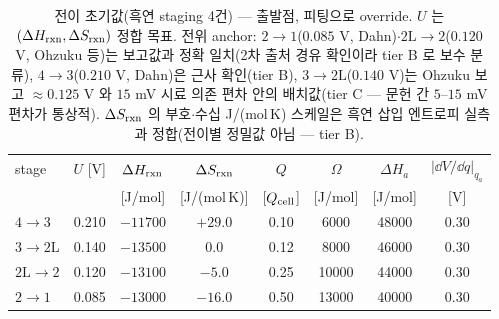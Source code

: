 \begin{table}[t]
\centering\footnotesize
\renewcommand{\arraystretch}{1.3}
\caption{전이 초기값(흑연 staging 4건) --- 출발점, 피팅으로 override. $U$ 는 $(\Delta H_{\mathrm{rxn}},\Delta S_{\mathrm{rxn}})$
정합 목표. 전위 anchor: $2\!\to\!1$($0.085$ V, Dahn\cite{dahn1991})$\cdot$$2\mathrm
L\!\to\!2$($0.120$ V, Ohzuku 등\cite{ohzuku1993})는 보고값과 정확 일치(2차 출처 경유 확인이라 tier B 로
보수 분류), $4\!\to\!3$($0.210$ V, Dahn\cite{dahn1991})은 근사 확인(tier B),
$3\!\to\!2\mathrm L$($0.140$ V)는 Ohzuku 보고 $\approx0.125$ V 와 $15$ mV 시료 의존
편차 안의 배치값(tier C --- 문헌 간 $5$--$15$ mV 편차가 통상적). $\Delta S_{\mathrm{rxn}}$ 의 부호$\cdot$수십
J/(mol\,K) 스케일은 흑연 삽입 엔트로피 실측\cite{reynier2003} 과 정합(전이별 정밀값 아님 --- tier B).}
\label{tab:staging}
\begin{tabular}{l c c c c c c c}
\toprule
stage & $U$ [V] & $\Delta H_{\mathrm{rxn}}$ & $\Delta S_{\mathrm{rxn}}$ & $Q$ & $\Omega$ & $\Delta H_a$ & $|\dd V/\dd q|_{q_a}$ \\
 &  & [J/mol] & [J/(mol\,K)] & [$Q_{\mathrm{cell}}$] & [J/mol] & [J/mol] & [V] \\
\midrule
$4\!\to\!3$   & 0.210 & $-11700$ & $+29.0$ & 0.10 & 6000  & 48000 & 0.30 \\
$3\!\to\!2\mathrm L$ & 0.140 & $-13500$ & $0.0$   & 0.12 & 8000  & 46000 & 0.30 \\
$2\mathrm L\!\to\!2$ & 0.120 & $-13100$ & $-5.0$  & 0.25 & 10000 & 44000 & 0.30 \\
$2\!\to\!1$   & 0.085 & $-13000$ & $-16.0$ & 0.50 & 13000 & 40000 & 0.30 \\
\bottomrule
\end{tabular}
\end{table}

